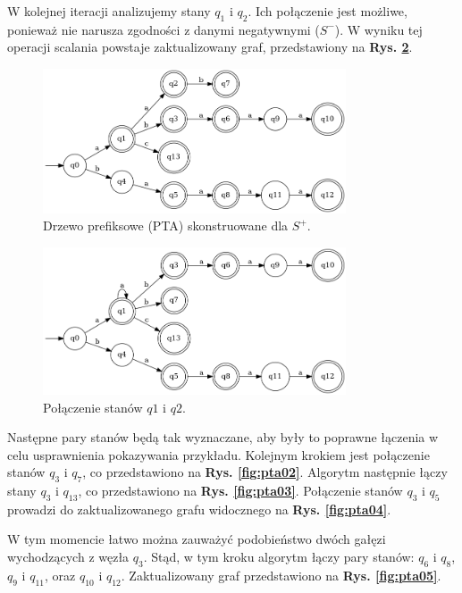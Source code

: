 W kolejnej iteracji analizujemy stany \( q_1 \) i \( q_2 \). Ich połączenie jest możliwe, ponieważ nie narusza zgodności z danymi negatywnymi (\( S^- \)). W wyniku tej operacji scalania powstaje zaktualizowany graf, przedstawiony na \textbf{Rys. \ref{fig:pta01}}.

\begin{figure}[ht]
    \centering
    \includegraphics[width=0.8\textwidth]{images/run_example/rpni/0.png}
    \caption{Drzewo prefiksowe (PTA) skonstruowane dla \( S^+ \).}
    \label{fig:pta00}
\end{figure}

\begin{figure}[ht]
    \centering
    \includegraphics[width=0.8\textwidth]{images/run_example/rpni/1.png}
    \caption{Połączenie stanów \( q1 \) i \( q2 \).}
    \label{fig:pta01}
\end{figure} 

Następne pary stanów będą tak wyznaczane, aby były to poprawne łączenia w celu usprawnienia pokazywania przykładu. Kolejnym krokiem jest połączenie stanów \( q_3 \) i \( q_7 \), co przedstawiono na \textbf{Rys. \ref{fig:pta02}}. Algorytm następnie łączy stany \( q_3 \) i \( q_{13} \), co przedstawiono na \textbf{Rys. \ref{fig:pta03}}. Połączenie stanów \( q_3 \) i \( q_5 \) prowadzi do zaktualizowanego grafu widocznego na \textbf{Rys. \ref{fig:pta04}}. 

W tym momencie łatwo można zauważyć podobieństwo dwóch gałęzi wychodzących z węzła \( q_3 \). Stąd, w tym kroku algorytm łączy pary stanów: \( q_6 \) i \( q_8 \), \( q_9 \) i \( q_{11} \), oraz \( q_{10} \) i \( q_{12} \). Zaktualizowany graf przedstawiono na \textbf{Rys. \ref{fig:pta05}}. 

